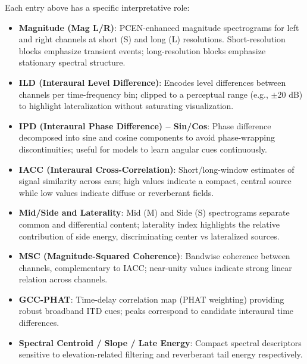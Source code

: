 \documentclass[12pt, a4paper]{article}
\begin{document}
Each entry above has a specific interpretative role:
\begin{itemize}
    \item \textbf{Magnitude (Mag L/R)}: PCEN-enhanced magnitude spectrograms for left and right channels at short (S) and long (L) resolutions. Short-resolution blocks emphasize transient events; long-resolution blocks emphasize stationary spectral structure.
    \item \textbf{ILD (Interaural Level Difference)}: Encodes level differences between channels per time-frequency bin; clipped to a perceptual range (e.g., $\pm$20 dB) to highlight lateralization without saturating visualization.
    \item \textbf{IPD (Interaural Phase Difference) -- Sin/Cos}: Phase difference decomposed into sine and cosine components to avoid phase-wrapping discontinuities; useful for models to learn angular cues continuously.
    \item \textbf{IACC (Interaural Cross-Correlation)}: Short/long-window estimates of signal similarity across ears; high values indicate a compact, central source while low values indicate diffuse or reverberant fields.
    \item \textbf{Mid/Side and Laterality}: Mid (M) and Side (S) spectrograms separate common and differential content; laterality index highlights the relative contribution of side energy, discriminating center vs lateralized sources.
    \item \textbf{MSC (Magnitude-Squared Coherence)}: Bandwise coherence between channels, complementary to IACC; near-unity values indicate strong linear relation across channels.
    \item \textbf{GCC-PHAT}: Time-delay correlation map (PHAT weighting) providing robust broadband ITD cues; peaks correspond to candidate interaural time differences.
    \item \textbf{Spectral Centroid / Slope / Late Energy}: Compact spectral descriptors sensitive to elevation-related filtering and reverberant tail energy respectively.
\end{itemize}
\end{document}
